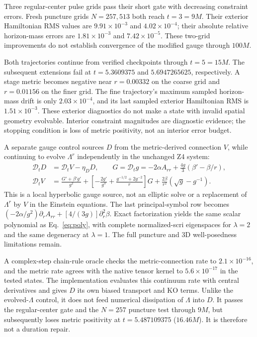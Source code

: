 \documentclass[11pt]{article}
\newcommand{\dt}{\mathcal D_t}
\begin{document}
Three regular-center pulse grids pass their short gate with decreasing constraint errors. Fresh puncture grids $N=257,513$ both reach $t=3=9M$. Their exterior Hamiltonian RMS values are $9.91\times10^{-3}$ and $4.02\times10^{-4}$; their absolute relative horizon-mass errors are $1.81\times10^{-3}$ and $7.42\times10^{-5}$. These two-grid improvements do not establish convergence of the modified gauge through $100M$.

Both trajectories continue from verified checkpoints through $t=5=15M$. The subsequent extensions fail at $t=5.3609375$ and $5.6947265625$, respectively. A stage metric becomes negative near $r=0.00332$ on the coarse grid and $r=0.01156$ on the finer grid. The fine trajectory's maximum sampled horizon-mass drift is only $2.03\times10^{-4}$, and its last sampled exterior Hamiltonian RMS is $1.51\times10^{-3}$. These exterior diagnostics do not make a state with invalid spatial geometry evolvable. Interior constraint magnitudes are diagnostic evidence; the stopping condition is loss of metric positivity, not an interior error budget.

A separate gauge control sources $D$ from the metric-derived connection $V$, while continuing to evolve $\Lambda^r$ independently in the unchanged Z4 system:
\begin{align}
 \dt D&=\dt V-\eta_DD,\qquad
 G=\dt g=-2\alpha A_{rr}+\frac{4g}{3}(\beta'-\beta/r),\\
 \dt V&=\frac{G'+\beta'g'}{g^2}
 +\left[-\frac{2g'}{g^3}+\frac{g^{-1/2}+2g^{-2}}{r}\right]G
 +\frac{2\beta}{r^2}(\sqrt g-g^{-1}).
\end{align}
This is a local hyperbolic gauge source, not an elliptic solve or a replacement of $\Lambda^r$ by $V$ in the Einstein equations. The last principal-symbol row becomes $(-2\alpha/g^2)\partial_rA_{rr}+[4/(3g)]\partial_r^2\beta$. Exact factorization yields the same scalar polynomial as Eq.~\eqref{eq:poly}, with complete normalized-scri eigenspaces for $\lambda=2$ and the same degeneracy at $\lambda=1$. The full puncture and 3D well-posedness limitations remain.

A complex-step chain-rule oracle checks the metric-connection rate to $2.1\times10^{-16}$, and the metric rate agrees with the native tensor kernel to $5.6\times10^{-17}$ in the tested states. The implementation evaluates this continuum rate with central derivatives and gives $D$ its own biased transport and KO terms. Unlike the evolved-$\Lambda$ control, it does not feed numerical dissipation of $\Lambda$ into $D$. It passes the regular-center gate and the $N=257$ puncture test through $9M$, but subsequently loses metric positivity at $t=5.487109375$ ($16.46M$). It is therefore not a duration repair.
\end{document}
